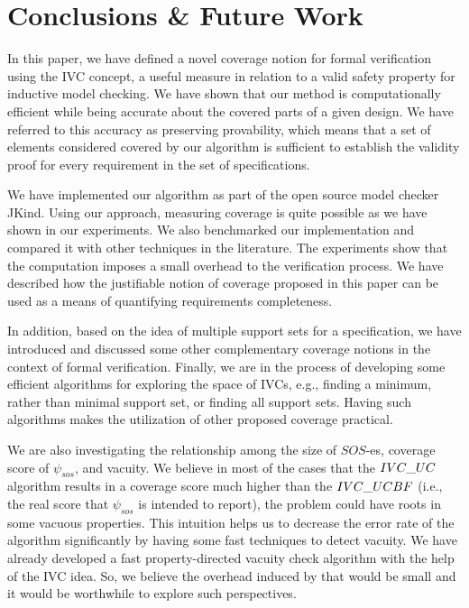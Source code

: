 \section{Conclusions \& Future Work}
\label{sec:conclusion}

In this paper, we have defined a novel coverage notion for formal verification using
the IVC concept, a useful measure in relation to
a valid safety property for inductive model checking. We have shown that our method
 is computationally efficient while
 being accurate about the covered parts of a given design.
 We have referred to this accuracy as preserving provability, which means
 that a set of elements considered covered by our algorithm is sufficient
 to establish the validity proof for every requirement in the set of specifications.

 We have implemented
our algorithm as part of the open source model checker JKind. Using our approach, measuring coverage is quite possible as we have shown in our experiments.
 We also benchmarked our implementation and compared it with other techniques in the literature.
 The experiments show that the computation imposes a small overhead to the verification process. We have described how the justifiable notion of coverage proposed in this paper can be used as a
means of quantifying requirements completeness.

 In addition, based on the idea of multiple support sets for a specification, we
 have introduced and discussed some other complementary coverage notions in the context of formal verification. Finally, we are in the process of developing some efficient algorithms for exploring the space of IVCs, e.g., finding a
minimum, rather than minimal support set, or finding all support sets. Having such algorithms makes the utilization of other proposed coverage practical.

We are also investigating the relationship among the size of $SOS$-es, coverage score of $\psi_{sos}$, and vacuity. We believe in most of the cases that the ${IVC\_UC}$ algorithm results in a coverage score much higher
than the ${IVC\_UCBF}$ (i.e., the real score that $\psi_{sos}$ is intended to report), the problem
could have roots in some vacuous properties. This intuition helps us to decrease the error rate of the \ucalg algorithm significantly by having some fast techniques to detect vacuity. We have already developed a  fast property-directed vacuity check
algorithm with the help of the IVC idea. So, we believe the overhead induced by that would be small and it would be worthwhile to explore such perspectives. 